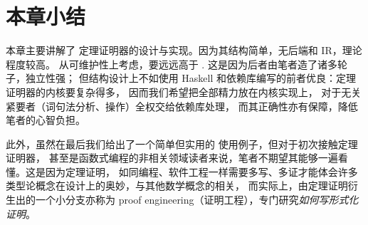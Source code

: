 %
%
%
%

\section{本章小结}
本章主要讲解了 \Tigrisd 定理证明器的设计与实现。因为其结构简单，无后端和 IR，理论程度较高。
从可维护性上考虑，\Tigrisd 要远远高于 \Tigris. 这是因为后者由笔者造了诸多轮子，独立性强；
但结构设计上不如使用 Haskell 和依赖库编写的前者优良：定理证明器的内核要复杂得多，
因而我们希望把全部精力放在内核实现上，
对于无关紧要者（词句法分析、\lambdacalc 操作）全权交给依赖库处理，
而其正确性亦有保障，降低笔者的心智负担。

此外，虽然在最后我们给出了一个简单但实用的 \Tigrisd 使用例子，但对于初次接触定理证明器，
甚至是函数式编程的非相关领域读者来说，笔者不期望其能够一遍看懂。这是因为定理证明，
如同编程、软件工程一样需要多写、多证才能体会许多类型论概念在设计上的奥妙，与其他数学概念的相关，
而实际上，由定理证明衍生出的一个小分支亦称为 proof engineering（证明工程），专门研究\emph{如何写形式化证明}。